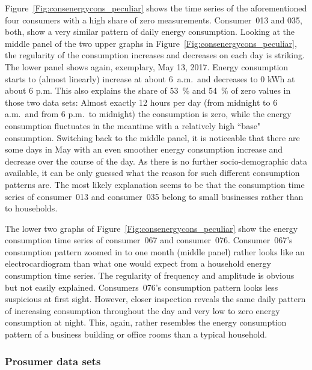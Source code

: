 Figure~\ref{Fig:consenergycons_peculiar} shows the time series of the aforementioned four consumers with a high share of zero measurements. Consumer~013 and 035, both, show a very similar pattern of daily energy consumption. Looking at the middle panel of the two upper graphs in Figure~\ref{Fig:consenergycons_peculiar}, the regularity of the consumption increases and decreases on each day is striking. The lower panel shows again, exemplary, May 13, 2017. Energy consumption starts to (almost linearly) increase at about 6~a.m.~and decreases to 0 kWh at about 6 p.m. This also explains the share of 53~\% and 54~\% of zero values in those two data sets: Almost exactly 12 hours per day (from midnight to 6 a.m.~and from 6 p.m.~to midnight) the consumption is zero, while the energy consumption fluctuates in the meantime with a relatively high ``base" consumption. Switching back to the middle panel, it is noticeable that there are some days in May with an even smoother energy consumption increase and decrease over the course of the day. As there is no further socio-demographic data available, it can be only guessed what the reason for such different consumption patterns are. The most likely explanation seems to be that the consumption time series of consumer~013 and consumer~035 belong to small businesses rather than to households.

The lower two graphs of Figure~\ref{Fig:consenergycons_peculiar} show the energy consumption time series of consumer~067 and consumer~076. Consumer~067's consumption pattern zoomed in to one month (middle panel) rather looks like an electrocardiogram than what one would expect from a household energy consumption time series. The regularity of frequency and amplitude is obvious but not easily explained. Consumers~076's consumption pattern looks less suspicious at first sight. However, closer inspection reveals the same daily pattern of increasing consumption throughout the day and very low to zero energy consumption at night. This, again, rather resembles the energy consumption pattern of a business building or office rooms than a typical household.



\subsubsection{Prosumer data sets}

